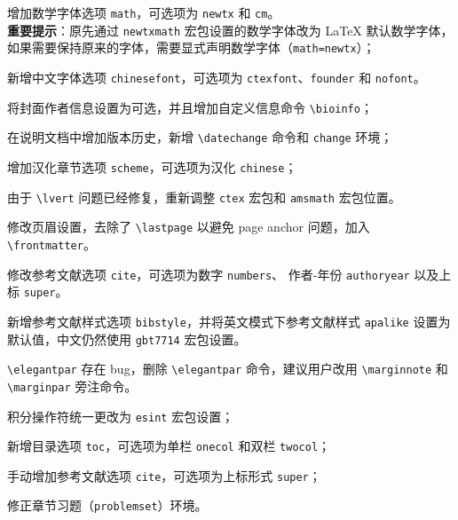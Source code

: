 \documentclass[lang=cn,newtx,10pt,scheme=chinese]{elegantbook}
\begin{document}
\begin{change}
  \item 增加数学字体选项 \lstinline{math}，可选项为 \lstinline{newtx} 和 \lstinline{cm}。\\
  \textbf{重要提示}：原先通过 \lstinline{newtxmath} 宏包设置的数学字体改为 \LaTeX{} 默认数学字体，如果需要保持原来的字体，需要显式声明数学字体（\lstinline{math=newtx}）；
  \item 新增中文字体选项 \lstinline{chinesefont}，可选项为 \lstinline{ctexfont}、\lstinline{founder} 和 \lstinline{nofont}。
  \item 将封面作者信息设置为可选，并且增加自定义信息命令 \lstinline{\bioinfo}；
  \item 在说明文档中增加版本历史，新增 \lstinline{\datechange} 命令和 \lstinline{change} 环境；
  \item 增加汉化章节选项 \lstinline{scheme}，可选项为汉化 \lstinline{chinese}；
  \item 由于 \lstinline{\lvert} 问题已经修复，重新调整 \lstinline{ctex} 宏包和 \lstinline{amsmath} 宏包位置。
  \item 修改页眉设置，去除了 \lstinline{\lastpage} 以避免 page anchor 问题，加入 \lstinline{\frontmatter}。
  \item 修改参考文献选项 \lstinline{cite}，可选项为数字 \lstinline{numbers}、 作者-年份 \lstinline{authoryear} 以及上标 \lstinline{super}。
  \item 新增参考文献样式选项 \lstinline{bibstyle}，并将英文模式下参考文献样式 \lstinline{apalike} 设置为默认值，中文仍然使用 \lstinline{gbt7714} 宏包设置。
\end{change}


\begin{change}
  \item \lstinline{\elegantpar} 存在 bug，删除 \lstinline{\elegantpar} 命令，建议用户改用 \lstinline{\marginnote} 和 \lstinline{\marginpar} 旁注命令。
  \item 积分操作符统一更改为 \lstinline{esint} 宏包设置；
  \item 新增目录选项 \lstinline{toc}，可选项为单栏 \lstinline{onecol} 和双栏 \lstinline{twocol}；
  \item 手动增加参考文献选项 \lstinline{cite}，可选项为上标形式 \lstinline{super}；
  \item 修正章节习题（\lstinline{problemset}）环境。
\end{change}

\end{document}
